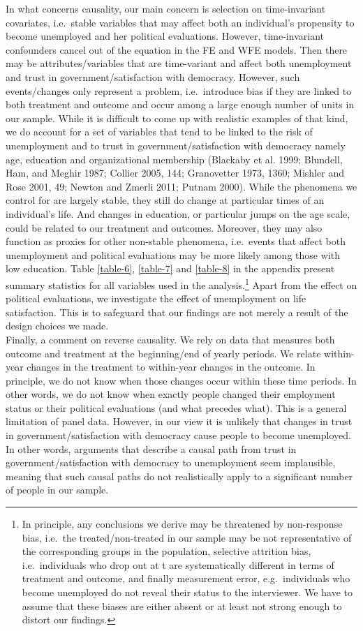 \documentclass[12pt,]{article}
\let\rmarkdownfootnote\footnote%
\def\footnote{\protect\rmarkdownfootnote}
\begin{document}
In what concerns causality, our main concern is selection on time-invariant covariates, i.e.~stable variables that may affect both an individual's propensity to become unemployed and her political evaluations. However, time-invariant confounders cancel out of the equation in the FE and WFE models. Then there may be attributes/variables that are time-variant and affect both unemployment and trust in government/satisfaction with democracy. However, such events/changes only represent a problem, i.e.~introduce bias if they are linked to both treatment and outcome and occur among a large enough number of units in our sample. While it is difficult to come up with realistic examples of that kind, we do account for a set of variables that tend to be linked to the risk of unemployment and to trust in government/satisfaction with democracy namely age, education and organizational membership (Blackaby et al. 1999; Blundell, Ham, and Meghir 1987; Collier 2005, 144; Granovetter 1973, 1360; Mishler and Rose 2001, 49; Newton and Zmerli 2011; Putnam 2000). While the phenomena we control for are largely stable, they still do change at particular times of an individual's life. And changes in education, or particular jumps on the age scale, could be related to our treatment and outcomes. Moreover, they may also function as proxies for other non-stable phenomena, i.e.~events that affect both unemployment and political evaluations may be more likely among those with low education. Table \ref{table-6}, \ref{table-7} and \ref{table-8} in the appendix present summary statistics for all variables used in the analysis.\footnote{In principle, any conclusions we derive may be threatened by non-response bias, i.e.~the treated/non-treated in our sample may be not representative of the corresponding groups in the population, selective attrition bias, i.e.~individuals who drop out at t are systematically different in terms of treatment and outcome, and finally measurement error, e.g.~individuals who become unemployed do not reveal their status to the interviewer. We have to assume that these biases are either absent or at least not strong enough to distort our findings.}
Apart from the effect on political evaluations, we investigate the effect of unemployment on life satisfaction. This is to safeguard that our findings are not merely a result of the design choices we made.\\
Finally, a comment on reverse causality. We rely on data that measures both outcome and treatment at the beginning/end of yearly periods. We relate within-year changes in the treatment to within-year changes in the outcome. In principle, we do not know when those changes occur within these time periods. In other words, we do not know when exactly people changed their employment status or their political evaluations (and what precedes what). This is a general limitation of panel data. However, in our view it is unlikely that changes in trust in government/satisfaction with democracy cause people to become unemployed. In other words, arguments that describe a causal path from trust in government/satisfaction with democracy to unemployment seem implausible, meaning that such causal paths do not realistically apply to a significant number of people in our sample.
\end{document}
